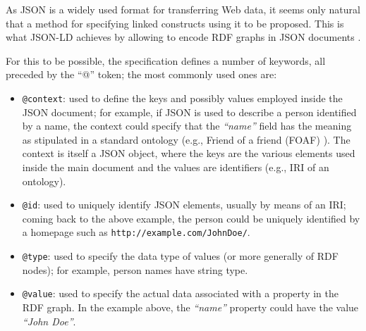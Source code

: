 
As JSON is a widely used format for transferring Web data, it seems only
natural that a method for specifying linked constructs using it to be proposed.
This is what JSON-LD achieves by allowing to encode RDF graphs in JSON
documents \cite{ref:jsonld}.

For this to be possible, the specification defines a number of keywords, all
preceded by the ``@'' token; the most commonly used ones are:
\begin{itemize}
  \item \texttt{@context}: used to define the keys and possibly values employed
                           inside the JSON document; for example, if JSON
                           is used to describe a person identified by a name,
                           the context could specify that the \textit{``name''}
                           field has the meaning as stipulated in a standard
                           ontology (e.g., Friend of a friend
                           (FOAF) \cite{ref:foaf}). The context is itself a JSON
                           object, where the keys are the various elements used
                           inside the main document and the values are
                           identifiers (e.g., IRI of an ontology).
  \item \texttt{@id}: used to uniquely identify JSON elements, usually by
                      means of an IRI; coming back to the above example, the
                      person could be uniquely identified by a homepage such as
                      \texttt{http://example.com/JohnDoe/}.
  \item \texttt{@type}: used to specify the data type of values (or more
                        generally of RDF nodes); for example, person names have
                        string type.
  \item \texttt{@value}: used to specify the actual data associated with a
                         property in the RDF graph. In the example above, the
                         \textit{``name''} property could have the value
                         \textit{``John Doe''}.
\end{itemize}

\newpage

